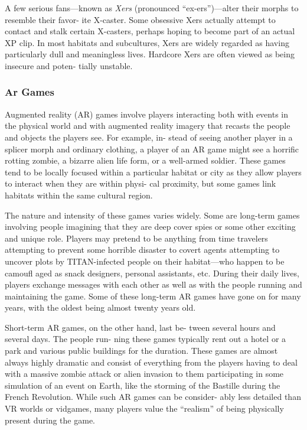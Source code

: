 A few serious fans—known as \textit{Xers} (pronounced 
``ex-ers'')—alter their morphs to resemble their favor-
ite X-caster. Some obsessive Xers actually attempt to 
contact and stalk certain X-casters, perhaps hoping 
to become part of an actual XP clip. In most habitats 
and subcultures, Xers are widely regarded as having 
particularly dull and meaningless lives. Hardcore 
Xers are often viewed as being insecure and poten-
tially unstable.

\subsubsection{Ar Games}

Augmented reality (AR) games involve players 
interacting both with events in the physical world 
and with augmented reality imagery that recasts the 
people and objects the players see. For example, in-
stead of seeing another player in a splicer morph and 
ordinary clothing, a player of an AR game might see 
a horrific rotting zombie, a bizarre alien life form, or 
a well-armed soldier. These games tend to be locally 
focused within a particular habitat or city as they 
allow players to interact when they are within physi-
cal proximity, but some games link habitats within 
the same cultural region.

The nature and intensity of these games varies 
widely. Some are long-term games involving people 
imagining that they are deep cover spies or some other 
exciting and unique role. Players may pretend to be 
anything from time travelers attempting to prevent 
some horrible disaster to covert agents attempting 
to uncover plots by TITAN-infected people on their 
habitat—who happen to be camoufl aged as snack 
designers, personal assistants, etc. During their daily 
lives, players exchange messages with each other as 
well as with the people running and maintaining 
the game. Some of these long-term AR games have 
gone on for many years, with the oldest being almost 
twenty years old.

Short-term AR games, on the other hand, last be-
tween several hours and several days. The people run-
ning these games typically rent out a hotel or a park 
and various public buildings for the duration. These 
games are almost always highly dramatic and consist 
of everything from the players having to deal with 
a massive zombie attack or alien invasion to them 
participating in some simulation of an event on Earth, 
like the storming of the Bastille during the French 
Revolution. While such AR games can be consider-
ably less detailed than VR worlds or vidgames, many 
players value the ``realism'' of being physically present 
during the game.

